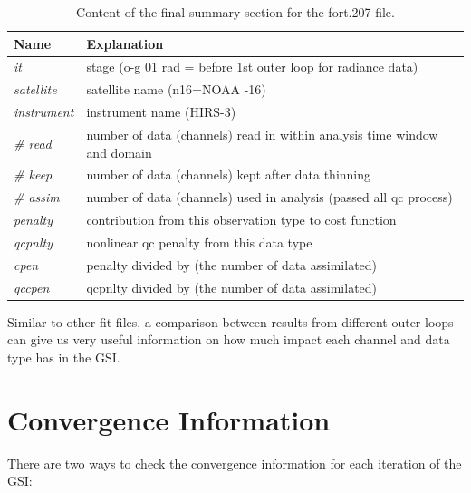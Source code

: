 \begin{itemize}[leftmargin=*]
\begin{table}[htbp]
\centering
\caption{Content of the final summary section for the fort.207 file.}
\begin{tabular}{|p{2.0cm}|p{10cm}|}
\hline
\hline
 Name & Explanation \\
\hline
\hline
\textit{it} & stage (o-g 01 rad = before 1st outer loop for radiance data) \\
\hline
\textit{satellite} & satellite name (n16=NOAA -16) \\
\hline
\textit{instrument} & instrument name (HIRS-3) \\
\hline
\textit{\# read} & number of data (channels) read in within analysis time window and domain\\
\hline
\textit{\# keep} & number of data (channels) kept after data thinning \\
\hline
\textit{\# assim} & number of data (channels) used in analysis (passed all qc process) \\
\hline
\textit{penalty} & contribution from this observation type to cost function  \\
\hline
\textit{qcpnlty} & nonlinear qc penalty from this data type \\
\hline
\textit{cpen} & penalty divided by (the number of data assimilated)  \\
\hline
\textit{qccpen} & qcpnlty divided by (the number of data assimilated)\\
\hline
\end{tabular}
\label{tab49}
\end{table} 

Similar to other fit files, a comparison between results from different outer loops can give us very useful information on how much impact each channel and data type has in the GSI.

\end{itemize}

\section{Convergence Information}
\label{sec4.6}

There are two ways to check the convergence information for each iteration of the GSI:

